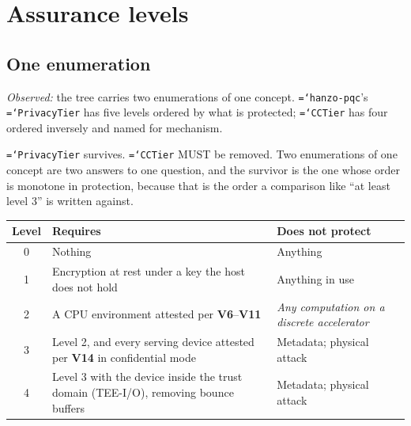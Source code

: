 \documentclass[11pt,a4paper]{article}
\newcommand{\code}[1]{\texttt{\hyphenchar\font=`\-\relax #1}}
\newcommand{\req}[1]{\textbf{#1}}
\begin{document}
\section{Assurance levels}
\label{sec:levels}

\subsection{One enumeration}

\emph{Observed:} the tree carries two enumerations of one concept.
\code{hanzo-pqc}'s \code{PrivacyTier} has five levels ordered by what is protected;
\code{CCTier} has four ordered inversely and named for mechanism.

\begin{description}[leftmargin=1.6em]
\item[\req{L1}] \code{PrivacyTier} survives. \code{CCTier} MUST be removed. Two
enumerations of one concept are two answers to one question, and the survivor is the
one whose order is monotone in protection, because that is the order a comparison
like ``at least level 3'' is written against.
\end{description}

\begin{center}
\small
\begin{tabular}{@{}cL{0.34\textwidth}L{0.40\textwidth}@{}}
\toprule
Level & Requires & Does not protect \\
 & Nothing & Anything \\
1 & Encryption at rest under a key the host does not hold & Anything in use \\
2 & A CPU environment attested per \req{V6}--\req{V11} & \emph{Any computation on a
discrete accelerator} \\
3 & Level 2, and every serving device attested per \req{V14} in confidential mode &
Metadata; physical attack \\
4 & Level 3 with the device inside the trust domain (TEE-I/O), removing bounce
buffers & Metadata; physical attack \\
\bottomrule
\end{tabular}
\end{center}
\end{document}
